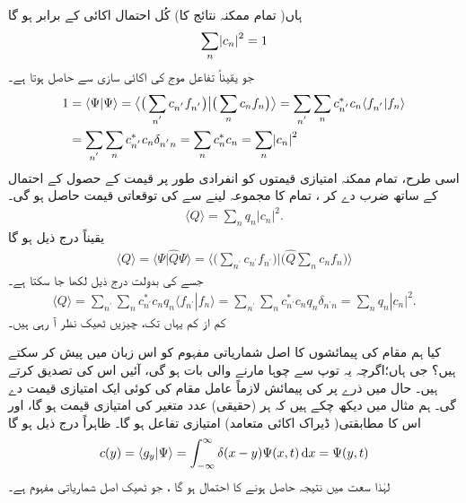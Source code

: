  ہاں( تمام ممکنہ نتائج کا) کُل احتمال اکائی کے برابر ہو گا
\begin{align}
\sum_{n} \abs{c_{n}}^{2} = 1
\end{align}
جو یقیناً تفاعل موج کی اکائی سازی   سے حاصل ہوتا ہے۔
\begin{gather}
\begin{aligned}
1 &= \langle \Psi | \Psi \rangle = \big\langle \big( \sum_{n^{'}}c_{n^{'}}f_{n^{'}}\big) \big | \big( \sum_{n} c_{n}f_{n} \big) \big\rangle = \sum_{n^{'}}\sum_{n} c_{n^{'}}^{*}c_{n}\langle f_{n^{'}} | f_{n} \rangle \\
&= \sum_{n^{'}}\sum_{n} c_{n^{'}}^{*}c_{n} \delta_{n^{'}n} = \sum_{n}c_{n}^{*}c_{n} = \sum_{n}\abs{c_{n}}^{2}
\end{aligned}
\end{gather}
اسی طرح،  تمام ممکنہ امتیازی قیمتوں  کو انفرادی طور پر  قیمت کے حصول کے احتمال کے ساتھ ضرب دے کر ، تمام کا مجموعہ لینے سے  کی توقعاتی قیمت حاصل ہو گی۔
\begin{align}
\langle Q \rangle = \sum_{n}q_{n}|c_{n}|^{2}.
\end{align}
یقیناً درج ذیل ہو گا 
\begin{align}
\langle Q \rangle = \langle \Psi | \hat{Q} \Psi \rangle = \big\langle \big( \sum_{n^{'}}c_{n^{'}}f_{n^{'}}\big) \big | \big( \hat{Q} \sum_{n} c_{n}f_{n} \big) \big \rangle
\end{align}
جسے  کی بدولت درج ذیل لکھا جا سکتا ہے۔
\begin{align}
\langle Q \rangle = \sum_{n^{'}}\sum_{n} c_{n^{'}}^{*}c_{n} q_{n} \langle f_{n^{'}} | f_{n} \rangle = \sum_{n^{'}}\sum_{n} c_{n^{'}}^{*}c_{n} q_{n} \delta_{n^{'}n} =\sum_{n}q_{n}|c_{n}|^{2}.
\end{align}
کم از کم یہاں تک، چیزیں ٹھیک نظر آ رہی ہیں۔

کیا ہم مقام کی پیمائشوں کا  اصل شماریاتی مفہوم کو اس زبان میں پیش کر سکتے ہیں؟ جی ہاں؛اگرچہ یہ توپ سے چوہا مارنے والی بات ہو گی، آئیں اس کی تصدیق کرتے ہیں۔ حال  میں  ذرے پر   کی پیمائش لازماً عامل مقام کی کوئی ایک امتیازی قیمت دے گی۔ ہم مثال  میں دیکھ چکے ہیں کہ ہر (حقیقی)  عدد  متغیر  کی  امتیازی قیمت ہو گا، اور اس کا مطابقتی( ڈیراک اکائی متعامد) امتیازی تفاعل  ہو گا۔ ظاہراً درج ذیل ہو گا
\begin{align}
c(y) = \langle g_{y} | \Psi \rangle= \int_{-\infty}^{\infty} \delta(x-y) \Psi(x,t)\dif x = \Psi(y,t)
\end{align}
لہٰذا سعت  میں نتیجہ حاصل ہونے کا احتمال  ہو گا ، جو ٹھیک اصل شماریاتی مفہوم ہے۔

